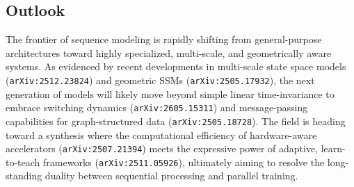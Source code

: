 \documentclass[11pt]{article}
\begin{document}
\subsection{Outlook}

The frontier of sequence modeling is rapidly shifting from general-purpose architectures toward highly specialized, multi-scale, and geometrically aware systems. As evidenced by recent developments in multi-scale state space models (\texttt{arXiv:2512.23824}) and geometric SSMs (\texttt{arXiv:2505.17932}), the next generation of models will likely move beyond simple linear time-invariance to embrace switching dynamics (\texttt{arXiv:2605.15311}) and message-passing capabilities for graph-structured data (\texttt{arXiv:2505.18728}). The field is heading toward a synthesis where the computational efficiency of hardware-aware accelerators (\texttt{arXiv:2507.21394}) meets the expressive power of adaptive, learn-to-teach frameworks (\texttt{arXiv:2511.05926}), ultimately aiming to resolve the long-standing duality between sequential processing and parallel training.
\end{document}
